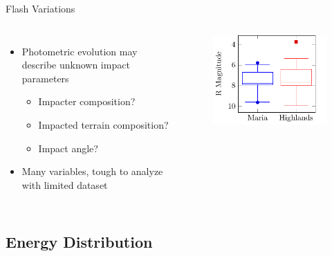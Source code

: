 \documentclass[pdf]{beamer}
\begin{document}
 \begin{frame}{Flash Variations}
   \begin{columns}
	 \begin{itemize}
	   \item Photometric evolution may describe unknown impact parameters
		 \begin{itemize}
		   \item Impacter composition?
		   \item Impacted terrain composition?
		   \item Impact angle?
		 \end{itemize}
	   \item Many variables, tough to analyze with limited dataset
	 \end{itemize}
	 \begin{figure}[ht!]
	   \centering
	   \includegraphics[width=\textwidth]{Images/LunarLightDarkBoxplot.pdf}
	 \end{figure}
   \end{columns}
 \end{frame}

 \subsection{Energy Distribution}
\end{document}
